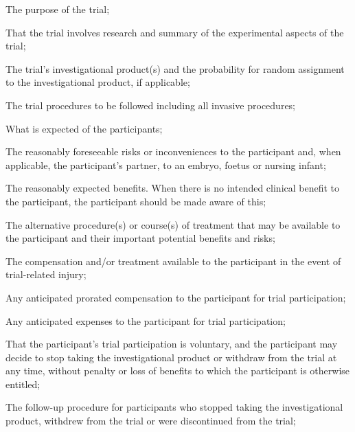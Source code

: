\documentclass[11pt]{article}
\begin{document}
\begin{description}[leftmargin=2.5cm,style=sameline]

\item[(a)] The purpose of the trial;

\item[(b)] That the trial involves research and summary of the experimental aspects of the trial;

\item[(c)] The trial's investigational product(s) and the probability for random assignment to the investigational product, if applicable;

\item[(d)] The trial procedures to be followed including all invasive procedures;

\item[(e)] What is expected of the participants;

\item[(f)] The reasonably foreseeable risks or inconveniences to the participant and, when applicable, the participant's partner, to an embryo, foetus or nursing infant;

\item[(g)] The reasonably expected benefits. When there is no intended clinical benefit to the participant, the participant should be made aware of this;

\item[(h)] The alternative procedure(s) or course(s) of treatment that may be available to the participant and their important potential benefits and risks;

\item[(i)] The compensation and/or treatment available to the participant in the event of trial-related injury;

\item[(j)] Any anticipated prorated compensation to the participant for trial participation;

\item[(k)] Any anticipated expenses to the participant for trial participation;

\item[(l)] That the participant's trial participation is voluntary, and the participant may decide to stop taking the investigational product or withdraw from the trial at any time, without penalty or loss of benefits to which the participant is otherwise entitled;

\item[(m)] The follow-up procedure for participants who stopped taking the investigational product, withdrew from the trial or were discontinued from the trial;


\end{description}
\end{document}
